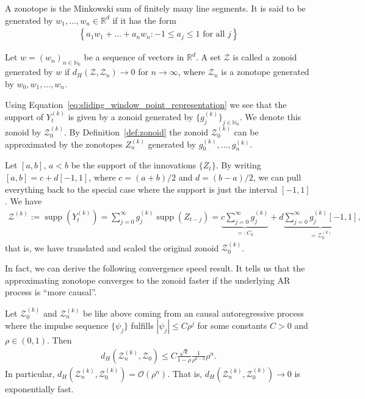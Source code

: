 \begin{Def}[Zonotope]
    A zonotope is the Minkowski sum of finitely many line segments. It is said to be generated by $w_1,\dots,w_n\in\mathbb{R}^d$ if it has the form
    \begin{align*}
        \left\{a_1w_1+\dots+a_nw_n:-1\le a_j\le 1\text{ for all }j\right\}
    \end{align*}
\end{Def}

\begin{Def}[Zonoid]\label{def:zonoid}
    Let $w=(w_n)_{n\in\mathbb{N}_0}$ be a sequence of vectors in $\mathbb{R}^d$. A set $\mathcal{Z}$ is called a zonoid generated by $w$ if $d_H(\mathcal{Z},\mathcal{Z}_n)\to0$ for $n\to\infty$, where $\mathcal{Z}_n$ is a zonotope generated by $w_0,w_1,\dots,w_n$.
\end{Def}

Using Equation~\eqref{eq:sliding_window_point_representation} we see that the support of $Y_t^{(k)}$ is given by a zonoid generated by $\{g_j^{(k)}\}_{j\in\mathbb{N}_0}$. We denote this zonoid by $\mathcal{Z}^{(k)}_0$. By Definition~\ref{def:zonoid} the zonoid $\mathcal{Z}^{(k)}_0$ can be approximated by the zonotopes $Z^{(k)}_n$ generated by $g_0^{(k)},\dots,g_n^{(k)}$.

Let $[a,b]$, $a<b$ be the support of the innovations $\{Z_t\}$. By writing $[a,b]=c+d[-1,1]$, where $c=(a+b)/2$ and $d=(b-a)/2$, we can pull everything back to the special case where the support is just the interval $[-1,1]$. We have
\begin{align*}
    \mathcal{Z}^{(k)}:=\operatorname{supp}(Y_t^{(k)})=\sum_{j=0}^{\infty}g_j^{(k)}\operatorname{supp}(Z_{t-j})=\underbrace{c\sum_{j=0}^{\infty}g_j^{(k)}}_{=:C_k}+d\underbrace{\sum_{j=0}^{\infty}g_j^{(k)}[-1,1]}_{=\mathcal{Z}^{(k)}_0},
\end{align*}
that is, we have translated and scaled the original zonoid $\mathcal{Z}^{(k)}_0$.

In fact, we can derive the following convergence speed result. It tells us that the approximating zonotope converges to the zonoid faster if the underlying AR process is \enquote{more causal}.

\begin{Prop}\label{prop:hausdorff_distance_convergence_speed}
    Let $\mathcal{Z}^{(k)}_0$ and $\mathcal{Z}^{(k)}_n$ be like above coming from an causal autoregressive process where the impulse sequence $\{\psi_j\}$ fulfills $|\psi_j|\le C\rho^{j}$ for some constants $C>0$ and $\rho\in(0,1)$. Then
    \begin{align*}
        d_H(\mathcal{Z}_n^{(k)},\mathcal{Z}_0)\le C\frac{\sqrt{k}}{1-\rho}\frac{1}{\rho^{k-2}}\rho^n.
    \end{align*}
    In particular, $d_H(\mathcal{Z}^{(k)}_n,\mathcal{Z}^{(k)}_0)=\mathcal{O}(\rho^{n})$. That is, $d_H(\mathcal{Z}^{(k)}_n,\mathcal{Z}^{(k)}_0)\to0$ is exponentially fast.
\end{Prop}

